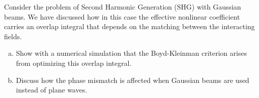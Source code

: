 %

\begin{exercicio}
Consider the problem of Second Harmonic Generation (SHG) with Gaussian beams. We have discussed how in this case the effective nonlinear coefficient carries an overlap integral that depends on the matching between the interacting fields.

\begin{enumerate}[a)]
\item Show with a numerical simulation that the Boyd-Kleinman criterion arises from optimizing this overlap integral.
\item Discuss how the phase mismatch is affected when Gaussian beams are used instead of plane waves.
\end{enumerate}
\end{exercicio}

